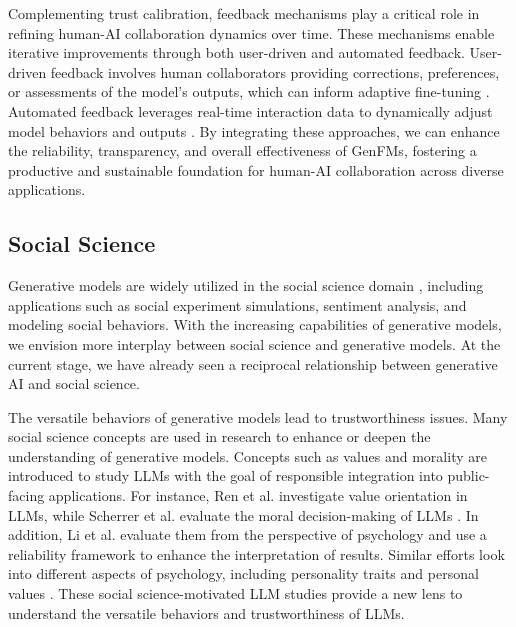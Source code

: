 Complementing trust calibration, feedback mechanisms play a critical role in refining human-AI collaboration dynamics over time. These mechanisms enable iterative improvements through both user-driven and automated feedback. User-driven feedback involves human collaborators providing corrections, preferences, or assessments of the model’s outputs, which can inform adaptive fine-tuning \cite{ouyang2022training, shaikh2024showdonttellaligning, wu2024aligningllmsindividualpreferences, li2024personalizedlanguagemodelingpersonalized}. Automated feedback leverages real-time interaction data to dynamically adjust model behaviors and outputs \cite{shi2024wildfeedbackaligningllmsinsitu, lin-etal-2024-interpretable}. By integrating these approaches, we can enhance the reliability, transparency, and overall effectiveness of GenFMs, fostering a productive and sustainable foundation for human-AI collaboration across diverse applications.

\subsection{Social Science}
Generative models are widely utilized in the social science domain \cite{pawar2024survey, zhang2024affective, bail2024can, wang2025limits}, including applications such as social experiment simulations, sentiment analysis, and modeling social behaviors. With the increasing capabilities of generative models, we envision more interplay between social science and generative models. At the current stage, we have already seen a reciprocal relationship between generative AI and social science.

The versatile behaviors of generative models lead to trustworthiness issues. Many social science concepts are used in research to enhance or deepen the understanding of generative models. Concepts such as values and morality are introduced to study LLMs with the goal of responsible integration into public-facing applications. For instance, Ren et al. \cite{ren-etal-2024-valuebench} investigate value orientation in LLMs, while Scherrer et al. evaluate the moral decision-making of LLMs \cite{scherrer2023evaluating}. In addition, Li et al. \cite{li2024quantifying} evaluate them from the perspective of psychology and use a reliability framework to enhance the interpretation of results. Similar efforts look into different aspects of psychology, including personality traits and personal values \cite{kovavc2024stick}. These social science-motivated LLM studies provide a new lens to understand the versatile behaviors and trustworthiness of LLMs.


